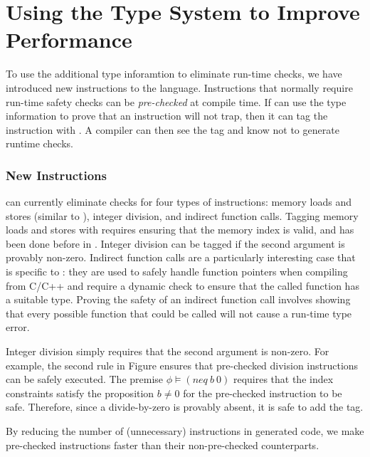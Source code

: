 \chapter{Using the Type System to Improve Performance}
\label{chp:prechk}

To use the additional type inforamtion to eliminate run-time checks, we have introduced new instructions to the \wasm language.
Instructions that normally require run-time safety checks can be \emph{pre-checked} at compile time.
If \name can use the type information to prove that an instruction will not trap, then it can tag the instruction with \prechk.
A compiler can then see the \prechk tag and know not to generate runtime checks.

\subsection{New Instructions}
\name can currently eliminate checks for four types of instructions: memory loads and stores (similar to \dtal), integer division, and indirect function calls.
Tagging memory loads and stores with \prechk requires ensuring that the memory index is valid, and has been done before in \dtal.
Integer division can be \prechk tagged if the second argument is provably non-zero.
Indirect function calls are a particularly interesting case that is specific to \wasm: they are used to safely handle function pointers when compiling from C/C++ and require a dynamic check to ensure that the called function has a suitable type.
Proving the safety of an indirect function call involves showing that every possible function that could be called will not cause a run-time type error.

Integer division simply requires that the second argument is non-zero.
For example, the second rule in Figure  ensures that pre-checked division instructions can be safely executed.
The premise $\phi \models (neq\ b\ 0)$ requires that the index constraints satisfy the proposition $b \neq 0$ for the pre-checked instruction to be safe.
Therefore, since a divide-by-zero is provably absent, it is safe to add the \prechk tag.


By reducing the number of (unnecessary) instructions in generated code, we make pre-checked instructions faster than their non-pre-checked counterparts.
